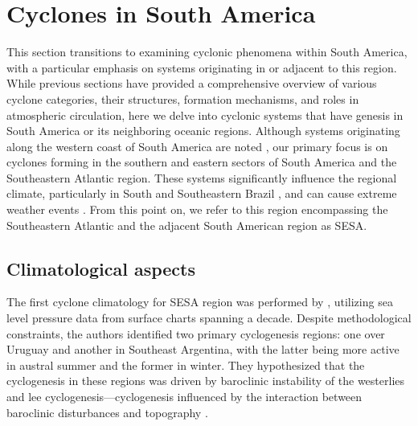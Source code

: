 \section{Cyclones in South America}\label{SA_cyclones_climatology}

This section transitions to examining cyclonic phenomena within South America, with a particular emphasis on systems originating in or adjacent to this region. While previous sections have provided a comprehensive overview of various cyclone categories, their structures, formation mechanisms, and roles in atmospheric circulation, here we delve into cyclonic systems that have genesis in South America or its neighboring oceanic regions. Although systems originating along the western coast of South America are noted \citep[e.g.,]{crespo2023assessment}, our primary focus is on cyclones forming in the southern and eastern sectors of South America and the Southeastern Atlantic region. These systems significantly influence the regional climate, particularly in South and Southeastern Brazil \citep[e.g.]{de2022hybrid,reboita2010regimes}, and can cause extreme weather events \citep[e.g.]{cardoso2022synoptic,de2021ocean,gramcianinov2020extreme}. From this point on, we refer to this region encompassing the Southeastern Atlantic and the adjacent South American region as SESA.

\subsection{Climatological aspects}

The first cyclone climatology for SESA region was performed by \citet{gan1991surface}, utilizing sea level pressure data from surface charts spanning a decade. Despite methodological constraints, the authors identified two primary cyclogenesis regions: one over Uruguay and another in Southeast Argentina, with the latter being more active in austral summer and the former in winter. They hypothesized that the cyclogenesis in these regions was driven by baroclinic instability of the westerlies and lee cyclogenesis—cyclogenesis influenced by the interaction between baroclinic disturbances and topography \citep{gan1994influence,tibaldi1980orographically}.

